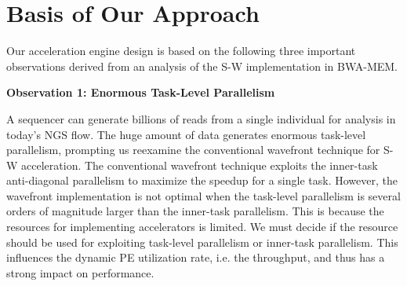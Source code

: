 \section{Basis of Our Approach}
\label{sec:approach}

Our acceleration engine design is based on the following three important observations 
derived from an analysis of the S-W implementation in BWA-MEM.

\vspace{1pt}
\textbf{Observation 1: Enormous Task-Level Parallelism}
\vspace{1pt}

A sequencer can generate billions of reads from a single individual for analysis in today's NGS flow.
The huge amount of data generates enormous task-level parallelism, prompting us reexamine the conventional wavefront technique for S-W acceleration.
The conventional wavefront technique exploits the inner-task anti-diagonal parallelism to maximize the speedup for a single task.
However, the wavefront implementation is not optimal when the task-level parallelism is several orders of magnitude larger than the inner-task parallelism.
This is because the resources for implementing accelerators is limited.
We must decide if the resource should be used for exploiting task-level parallelism or inner-task parallelism.
This influences the dynamic PE utilization rate, i.e. the throughput, and thus has a strong impact on performance.

